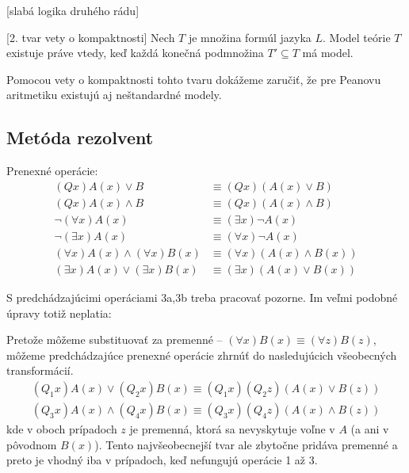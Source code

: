 \documentclass[a4paper]{report}
\newenvironment{dokaz}{\smallskip \par \noindent{\bfseries D:}}{}
\newenvironment{priklad}{\smallskip \par \noindent{\bfseries Príkl:}}{}
\newenvironment{veta}{\smallskip \par \noindent{\bfseries Veta:}}{}
\newenvironment{poznamka}{\smallskip \par \noindent{\bfseries Pozn:}}{}
\begin{document}
\begin{poznamka}[slabá logika druhého rádu]
\end{poznamka}

\begin{veta}[2. tvar vety o kompaktnosti]
    Nech $T$ je množina formúl jazyka $L$. 
    Model teórie $T$ existuje práve vtedy, keď každá konečná podmnožina
    $T' \subseteq T$ má model.
\end{veta}

\begin{dokaz}
\end{dokaz}

\begin{priklad}
    Pomocou vety o kompaktnosti tohto tvaru dokážeme zaručiť,
    že pre Peanovu aritmetiku existujú aj neštandardné modely.
\end{priklad}


\subsection{Metóda rezolvent}
Prenexné operácie:
\begin{align*}
    (Qx)A(x) \lor B &\equiv (Qx)(A(x) \lor B) \tag{1a}\\
    (Qx)A(x) \land B &\equiv (Qx)(A(x) \land B) \tag{1b}\\
    \neg (\forall x) A(x) &\equiv (\exists x) \neg A(x) \tag{2a}\\
    \neg (\exists x) A(x) &\equiv (\forall x) \neg A(x) \tag{2b}\\
    (\forall x) A(x) \land (\forall x) B(x) &\equiv 
        (\forall x) (A(x) \land B(x)) \tag{3a}\\
    (\exists x) A(x) \lor (\exists x) B(x) &\equiv
        (\exists x) (A(x) \lor B(x)) \tag{3b}
\end{align*}
\begin{poznamka}
    S predchádzajúcimi operáciami 3a,3b treba pracovať pozorne. Im veľmi
    podobné úpravy totiž neplatia:
\end{poznamka}

Pretože môžeme substituovať za premenné --
    $(\forall x) B(x) \equiv (\forall z) B(z)$, môžeme predchádzajúce
prenexné operácie zhrnúť do nasledujúcich všeobecných transformácií.
\begin{align*}
    (Q_1 x)A(x) \lor (Q_2 x)B(x) \equiv 
        (Q_1 x)(Q_2 z)(A(x) \lor B(z)) \tag{4a} \\
    (Q_3 x)A(x) \land (Q_4 x)B(x) \equiv
        (Q_3 x)(Q_4 z)(A(x) \land B(z)) \tag{4b}
\end{align*} 
kde v oboch prípadoch $z$ je premenná, ktorá sa nevyskytuje voľne v $A$
(a ani v pôvodnom $B(x)$).
Tento najvšeobecnejší tvar ale zbytočne pridáva premenné a preto je
vhodný iba v prípadoch, keď nefungujú operácie 1 až 3.
\end{document}
